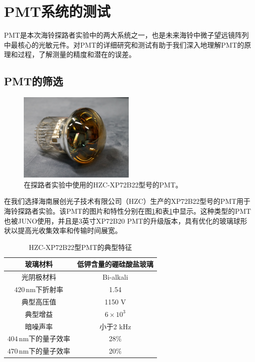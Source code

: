 \section{PMT系统的测试}

PMT是本次海铃探路者实验中的两大系统之一，也是未来海铃中微子望远镜阵列中最核心的光敏元件。对PMT的详细研究和测试有助于我们深入地理解PMT的原理和过程，了解测量的精度和潜在的误差。

\subsection{PMT的筛选}

\begin{figure}[ht]
    \centering
    \includegraphics[width=0.5\textwidth]{img/pmt_image.jpg}
    \caption{在探路者实验中使用的HZC-XP72B22型号的PMT。}
    \label{fig:pmt_view}
\end{figure}

在我们选择海南展创光子技术有限公司（HZC）生产的XP72B22型号的PMT用于海铃探路者实验。该PMT的图片和特性分别在图\ref{fig:pmt_view}和表\ref{tab:pmt_properties}中显示。这种类型的PMT也被JUNO使用，并且是3英寸XP72B20 PMT的升级版本，具有优化的玻璃球形状以提高光收集效率和传输时间展宽\cite{JUNO_PMT:2021}。

\begin{table}[ht]
    \centering
    \caption{HZC-XP72B22型PMT的典型特征}
    \begin{tabular}{c|c}
        \hline
        玻璃材料 & 低钾含量的硼硅酸盐玻璃 \\
        \hline 
        光阴极材料 & Bi-alkali \\
        \hline
        $420\,\mathrm{nm}$下折射率 & 1.54 \\
         \hline
         典型高压值 & 1150 V \\
         \hline
         典型增益 & $6\times 10^3$ \\
         \hline
         暗噪声率 & 小于2 kHz \\ 
         \hline
         $404\,\mathrm{nm}$下的量子效率 & 28$\%$ \\
         \hline
         $470\,\mathrm{nm}$下的量子效率 & 20$\%$ \\
         \hline 
    \end{tabular}
    \label{tab:pmt_properties}
\end{table}


